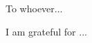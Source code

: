 \documentclass[12pt,american]{report}
\begin{document}
\beforepreface%

\vfill
\begin{center}
To whoever...
\end{center}
\vfill

%
\vfill
\begin{center}
\indent I am grateful for ...
\end{center}
\vfill

\newcommand{\etc} {\emph{etc.\/}}
\newcommand{\etal}{\emph{et~al.\/}}
\newcommand{\eg}  {\emph{e.g.\/}}
\newcommand{\ie}  {\emph{i.e.\/}}
\end{document}
